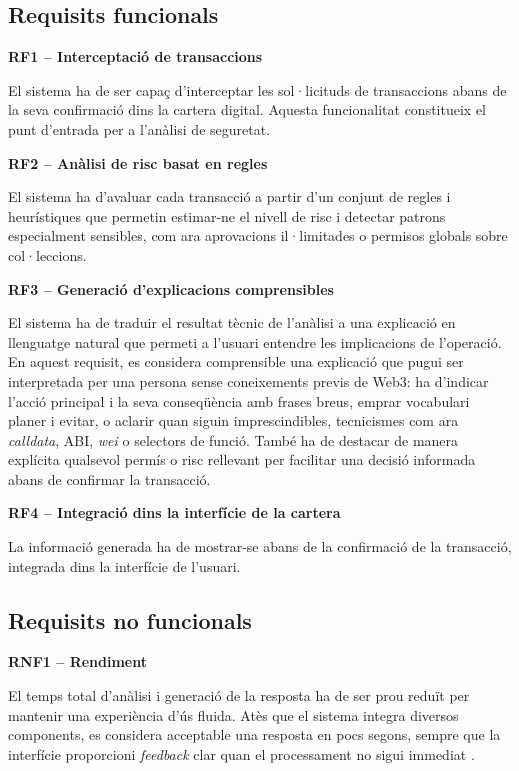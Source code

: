 \subsection{Requisits funcionals}

\textbf{RF1 -- Interceptació de transaccions}

El sistema ha de ser capaç d’interceptar les sol·licituds de transaccions abans de la seva confirmació dins la cartera digital. Aquesta funcionalitat constitueix el punt d’entrada per a l’anàlisi de seguretat.

\textbf{RF2 -- Anàlisi de risc basat en regles}

El sistema ha d’avaluar cada transacció a partir d’un conjunt de regles i heurístiques que permetin estimar-ne el nivell de risc i detectar patrons especialment sensibles, com ara aprovacions il·limitades o permisos globals sobre col·leccions.

\textbf{RF3 -- Generació d’explicacions comprensibles}

El sistema ha de traduir el resultat tècnic de l’anàlisi a una explicació en llenguatge natural que permeti a l’usuari entendre les implicacions de l’operació. En aquest requisit, es considera comprensible una explicació que pugui ser interpretada per una persona sense coneixements previs de Web3: ha d’indicar l’acció principal i la seva conseqüència amb frases breus, emprar vocabulari planer i evitar, o aclarir quan siguin imprescindibles, tecnicismes com ara \textit{calldata}, ABI, \textit{wei} o selectors de funció. També ha de destacar de manera explícita qualsevol permís o risc rellevant per facilitar una decisió informada abans de confirmar la transacció.

\textbf{RF4 -- Integració dins la interfície de la cartera}

La informació generada ha de mostrar-se abans de la confirmació de la transacció, integrada dins la interfície de l’usuari.

\subsection{Requisits no funcionals}


\textbf{RNF1 -- Rendiment}

El temps total d’anàlisi i generació de la resposta ha de ser prou reduït per mantenir una experiència d’ús fluida. Atès que el sistema integra diversos components, es considera acceptable una resposta en pocs segons, sempre que la interfície proporcioni \textit{feedback} clar quan el processament no sigui immediat \cite{nielsen_response_times}.

